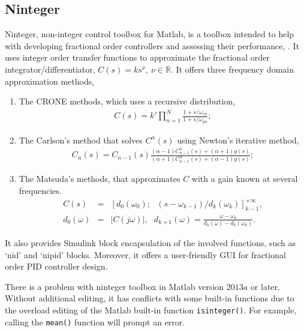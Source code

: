 \documentclass[11pt]{tCON2e}
\theoremstyle{plain}\newtheorem{theorem}{Theorem}
\theoremstyle{definition}
\theoremstyle{remark}
\begin{document}
\subsection{Ninteger}
Ninteger, non-integer control toolbox for Matlab, is a toolbox intended to help with developing fractional order controllers and assessing their performance, \cite{ref:Duarte3}. It uses integer order transfer functions to approximate the fractional order integrator/differentiator, $C(s) = k s^{\nu}, \ \nu \in \mathbb{R}$. It offers three frequency domain approximation methods,
\begin{enumerate}
    \item The CRONE methods, which uses a recursive distribution,
    \begin{eqnarray*}
        C(s) = k'\prod_{n=1}^N \frac{1+s/\omega_{zn}}{1+s/\omega_{pn}};
    \end{eqnarray*}
    \item The Carlson's method that solves $C^{\alpha}(s)$ using Newton's iterative method,
    \begin{eqnarray*}
        C_n(s) = C_{n-1}(s)\frac{(\alpha-1)C^{\alpha}_{n-1}(s)+(\alpha+1)g(s)}{(\alpha+1)C^{\alpha}_{n-1}(s)+(\alpha-1)g(s)};
    \end{eqnarray*}
    \item The Matsuda's methods, that approximates $C$ with a gain known at several frequencies.
    \begin{eqnarray*}
        C(s) &=& [d_0(\omega_0); \ \ \ (s-\omega_{k-1})/d_k(\omega_k)]^{+\infty}_{k-1}, \\
        d_0(\omega)&=& |C(j\omega)|, \ \ \ d_{k+1}(\omega) = \frac{\omega-\omega_k}{d_k(\omega) - d_k(\omega_k)}.
    \end{eqnarray*}
\end{enumerate}
It also provides Simulink block encapsulation of the involved functions, such as `nid' and `nipid' blocks. Moreover, it offers a user-friendly GUI for fractional order PID controller design.

There is a problem with ninteger toolbox in Matlab version $2013a$ or later. Without additional editing, it has conflicts with some built-in functions due to the overload editing of the Matlab built-in function {\tt isinteger()}. For example, calling the {\tt mean()} function will prompt an error.
\end{document}

